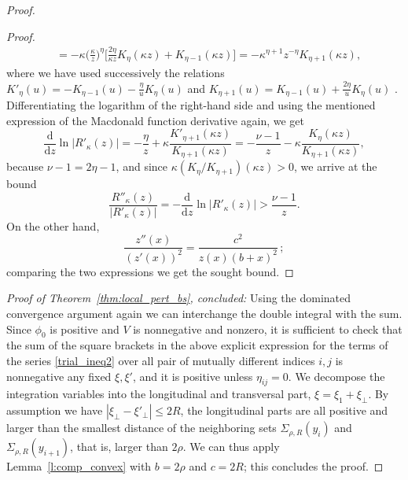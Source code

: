\documentclass{article}
\numberwithin{equation}{section}
\theoremstyle{definition}
\newcommand{\D}{\mathrm{d}}
\begin{document}
\begin{proof}
\begin{proof}
\begin{align*}
& = -\kappa\big(\textstyle{\frac{\kappa}{z}}\big)^\eta \Big[ \frac{2\eta}{\kappa z} K_\eta(\kappa z) +K_{\eta-1}(\kappa z) \Big] = -\kappa^{\eta+1} z^{-\eta} K_{\eta+1}(\kappa z),
\end{align*}
where we have used successively the relations $K'_\eta(u) = -K_{\eta-1}(u)-\frac{\eta}{u}K_\eta(u)$ and $K_{\eta+1}(u) = K_{\eta-1}(u) +\frac{2\eta}{u}K_\eta(u)$ \cite[9.6.26]{AS}. Differentiating the loga\-rithm of the right-hand side and using the mentioned expression of the Macdonald function derivative again, we get
\begin{equation*}
\frac{\D}{\D z}\ln|R'_\kappa(z)| = -\frac{\eta}{z} +\kappa \frac{K'_{\eta+1}(\kappa z)}{K_{\eta+1}(\kappa z)} = -\frac{\nu-1}{z} -\kappa \frac{K_\eta(\kappa z)}{K_{\eta+1}(\kappa z)},
\end{equation*}
because $\nu-1=2\eta-1$, and since $\kappa(K_\eta/K_{\eta+1})(\kappa z) > 0$, we arrive at the bound
 \begin{equation} \label{conv_bound}
\frac{R''_\kappa(z)}{|R'_\kappa(z)|} = -\frac{\D}{\D z}\ln|R'_\kappa(z)| > \frac{\nu-1}{z}.
\end{equation}
On the other hand,
\begin{equation*}
\frac{z''(x)}{(z'(x))^2} = \frac{c^2}{z(x)(b+x)^2}\,;
\end{equation*}
comparing the two expressions we get the sought bound.
\end{proof}

\noindent \emph{Proof of Theorem~\ref{thm:local_pert_bs}, concluded:} Using the dominated convergence argument again we can interchange the double integral with the sum. Since $\phi_0$ is positive and $V$ is nonnegative and nonzero, it is sufficient to check that the sum of the square brackets in the above explicit expression for the terms of the series \eqref{trial_ineq2} over all pair of mutually different indices $i,j$ is nonnegative any fixed $\xi,\xi'$, and it is positive unless $\eta_{ij}=0$. We decompose the integration variables into the longitudinal and transversal part, $\xi=\xi_1+\xi_\perp$. By assumption we have $|\xi_\perp- \xi'_\perp| \le 2R$, the longitudinal parts are all positive and larger than the smallest distance of the neighboring sets $\Sigma_{\rho,R}(y_i)$ and $\Sigma_{\rho,R}(y_{i+1})$, that is, larger than $2\rho$. We can thus apply Lemma~\ref{l:comp_convex} with $b=2\rho$ and $c=2R$; this concludes the proof.
\end{proof}
\end{document}
